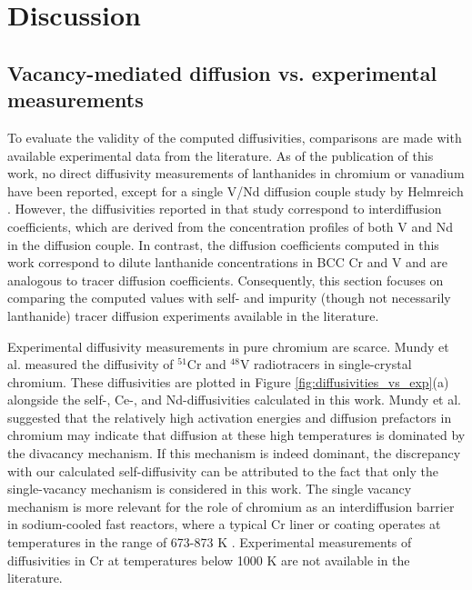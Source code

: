 \documentclass[preprint,12pt]{elsarticle}
\begin{document}
\FloatBarrier
\section{Discussion}

\subsection{Vacancy-mediated diffusion vs. experimental measurements}

To evaluate the validity of the computed diffusivities, comparisons are made with available experimental data from the literature. As of the publication of this work, no direct diffusivity measurements of lanthanides in chromium or vanadium have been reported, except for a single V/Nd diffusion couple study by Helmreich \cite{helmreich_diffusion_2014}. However, the diffusivities reported in that study correspond to interdiffusion coefficients, which are derived from the concentration profiles of both V and Nd in the diffusion couple. In contrast, the diffusion coefficients computed in this work correspond to dilute lanthanide concentrations in BCC Cr and V and are analogous to tracer diffusion coefficients. Consequently, this section focuses on comparing the computed values with self- and impurity (though not necessarily lanthanide) tracer diffusion experiments available in the literature.

Experimental diffusivity measurements in pure chromium are scarce. Mundy et al. \cite{mundy1976isotope} measured the diffusivity of $^{51}$Cr and $^{48}$V radiotracers in single-crystal chromium. These diffusivities are plotted in Figure \ref{fig:diffusivities_vs_exp}(a) alongside the self-, Ce-, and Nd-diffusivities calculated in this work. Mundy et al. \cite{mundy1976isotope} suggested that the relatively high activation energies and diffusion prefactors in chromium may indicate that diffusion at these high temperatures is dominated by the divacancy mechanism. If this mechanism is indeed dominant, the discrepancy with our calculated self-diffusivity can be attributed to the fact that only the single-vacancy mechanism is considered in this work. The single vacancy mechanism is more relevant for the role of chromium as an interdiffusion barrier in sodium-cooled fast reactors, where a typical Cr liner or coating operates at temperatures in the range of 673-873 K \cite{beausoleil_fast_2022}. Experimental measurements of diffusivities in Cr at temperatures below 1000 K are not available in the literature.
\end{document}
